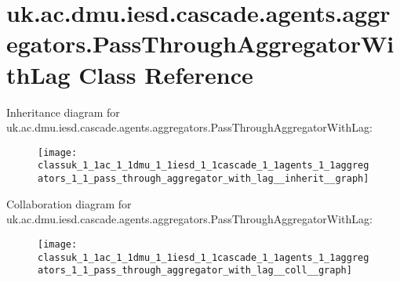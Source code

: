 \hypertarget{classuk_1_1ac_1_1dmu_1_1iesd_1_1cascade_1_1agents_1_1aggregators_1_1_pass_through_aggregator_with_lag}{\section{uk.\-ac.\-dmu.\-iesd.\-cascade.\-agents.\-aggregators.\-Pass\-Through\-Aggregator\-With\-Lag Class Reference}
\label{classuk_1_1ac_1_1dmu_1_1iesd_1_1cascade_1_1agents_1_1aggregators_1_1_pass_through_aggregator_with_lag}
}


Inheritance diagram for uk.\-ac.\-dmu.\-iesd.\-cascade.\-agents.\-aggregators.\-Pass\-Through\-Aggregator\-With\-Lag\-:\nopagebreak
\begin{figure}[H]
\begin{center}
\leavevmode
\texttt{[image: classuk\_1\_1ac\_1\_1dmu\_1\_1iesd\_1\_1cascade\_1\_1agents\_1\_1aggregators\_1\_1\_pass\_through\_aggregator\_with\_lag\_\_inherit\_\_graph]}
\end{center}
\end{figure}


Collaboration diagram for uk.\-ac.\-dmu.\-iesd.\-cascade.\-agents.\-aggregators.\-Pass\-Through\-Aggregator\-With\-Lag\-:\nopagebreak
\begin{figure}[H]
\begin{center}
\leavevmode
\texttt{[image: classuk\_1\_1ac\_1\_1dmu\_1\_1iesd\_1\_1cascade\_1\_1agents\_1\_1aggregators\_1\_1\_pass\_through\_aggregator\_with\_lag\_\_coll\_\_graph]}
\end{center}
\end{figure}
